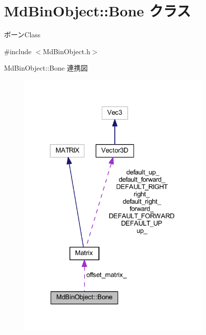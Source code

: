 \hypertarget{class_md_bin_object_1_1_bone}{}\section{Md\+Bin\+Object\+:\+:Bone クラス}
\label{class_md_bin_object_1_1_bone}


ボーン\+Class  




{\ttfamily \#include $<$Md\+Bin\+Object.\+h$>$}



Md\+Bin\+Object\+:\+:Bone 連携図\nopagebreak
\begin{figure}[H]
\begin{center}
\leavevmode
\includegraphics[width=269pt]{class_md_bin_object_1_1_bone__coll__graph}
\end{center}
\end{figure}
